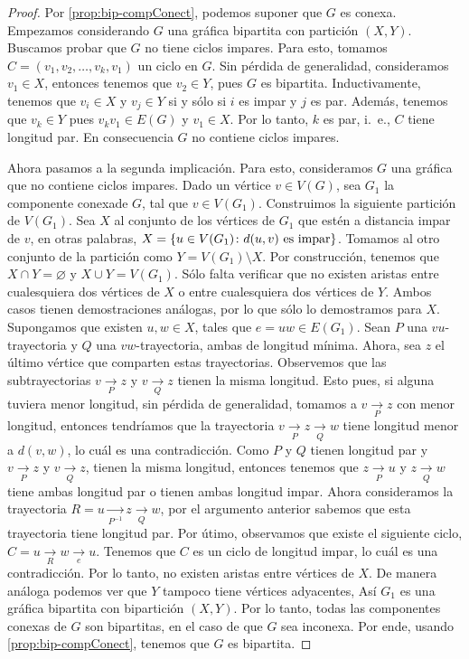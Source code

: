 \begin{proof}
    Por \cref{prop:bip-compConect}, podemos suponer que $G$ es conexa. Empezamos
    considerando $G$ una gr\'afica bipartita con partici\'on $(X,Y)$. Buscamos
    probar que $G$ no tiene ciclos impares. Para esto, tomamos
    $C=(v_1,v_2,\dots, v_k,v_1)$ un ciclo en $G$. Sin p\'erdida de generalidad,
    consideramos $v_1 \in X$, entonces tenemos que $v_2 \in Y$, pues $G$ es
    bipartita. Inductivamente, tenemos que $v_i \in X$ y $v_j \in Y$ si y s\'olo
    si $i$ es impar y $j$ es par. Adem\'as, tenemos que $v_k \in Y$ pues $v_k
    v_1 \in E(G)$ y $v_1 \in X$. Por lo tanto, $k$ es par, i.~e., $C$ tiene
    longitud par. En consecuencia $G$ no contiene ciclos impares.

    Ahora pasamos a la segunda implicaci\'on. Para esto, consideramos $G$ una
    gr\'afica que no contiene ciclos impares. Dado un v\'ertice $v \in V(G)$,
    sea  $G_1$ la componente conexade $G$, tal que $v \in V(G_1)$. Construimos
    la siguiente partici\'on de $V(G_1)$. Sea $X$ al conjunto de los v\'ertices
    de $G_1$ que est\'en a distancia impar de $v$, en otras palabras, $X = \{u
    \in V(G_1) \colon d(u,v) \textnormal{ es impar}\}$. Tomamos al otro conjunto
    de la partici\'on como $Y = V(G_1)\setminus X$. Por construcci\'on, tenemos
    que $X \cap Y = \varnothing$ y $X \cup Y = V(G_1)$. S\'olo falta verificar
    que no existen aristas entre cualesquiera dos v\'ertices de $X$ o entre
    cualesquiera dos v\'ertices de $Y$. Ambos casos tienen demostraciones
    an\'alogas, por lo que s\'olo lo demostramos para $X$. Supongamos que
    existen $u,w \in X$, tales que $e=uw \in E(G_1)$. Sean $P$ una
    $vu$-trayectoria y $Q$ una $vw$-trayectoria, ambas de longitud m\'inima.
    Ahora, sea $z$ el \'ultimo v\'ertice que comparten estas trayectorias.
    Observemos que las subtrayectorias $v \xrightarrow[P]{}z$ y $v
    \xrightarrow[Q]{}z$ tienen la misma longitud. Esto pues, si alguna tuviera
    menor longitud, sin p\'erdida de generalidad, tomamos a $v
    \xrightarrow[P]{}z$ con menor longitud, entonces tendr\'iamos que la
    trayectoria $v \xrightarrow[P]{}z\xrightarrow[Q]{}w$ tiene longitud menor a
    $d(v,w)$, lo cu\'al es una contradicci\'on. Como $P$ y $Q$ tienen longitud
    par y $v \xrightarrow[P]{}z$ y $v \xrightarrow[Q]{}z$, tienen la misma
    longitud, entonces tenemos que $z \xrightarrow[P]{}u$ y $z
    \xrightarrow[Q]{}w$ tiene ambas longitud par o tienen ambas longitud impar.
    Ahora consideramos la trayectoria $ R= u \xrightarrow[P^{-1}]{}z
    \xrightarrow[Q]{}w$, por el argumento anterior sabemos que esta trayectoria
    tiene longitud par. Por \'utimo, observamos que existe el siguiente ciclo,
    $C=u\xrightarrow[R]{}w\xrightarrow[e]{}u$. Tenemos que $C$ es un ciclo de
    longitud impar, lo cu\'al es una contradicci\'on. Por lo tanto, no existen
    aristas entre v\'ertices de $X$. De manera an\'aloga podemos ver que $Y$
    tampoco tiene v\'ertices adyacentes, As\'i $G_1$ es una gr\'afica bipartita
    con bipartici\'on $(X,Y)$. Por lo tanto, todas las componentes conexas de
    $G$ son bipartitas, en el caso de que $G$ sea inconexa. Por ende, usando
    \cref{prop:bip-compConect}, tenemos que $G$ es bipartita.
\end{proof}
    
